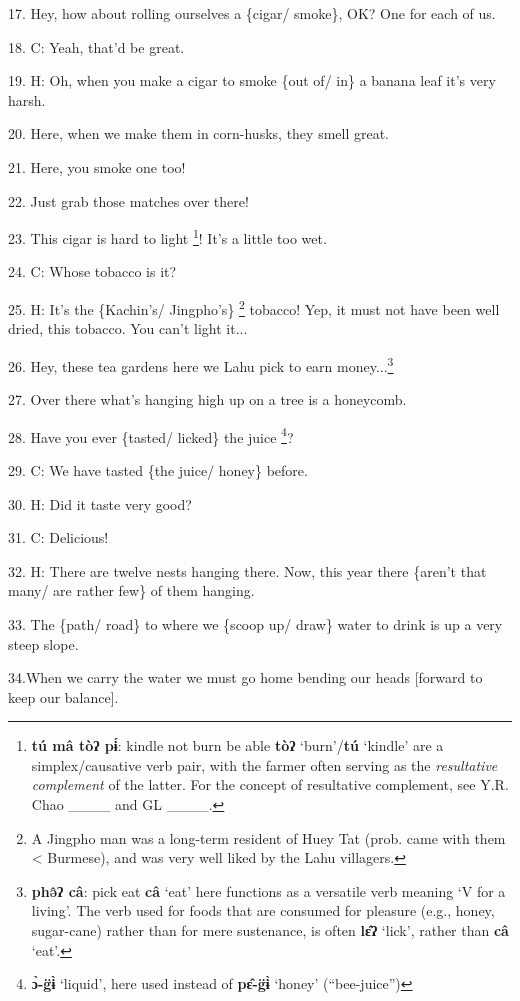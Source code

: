 17. Hey, how about rolling ourselves a \{cigar/ smoke\}, OK? One for each of us.

18. C: Yeah, that'd be great.

19. H: Oh, when you make a cigar to smoke \{out of/ in\} a banana leaf it's very
harsh.

20. Here, when we make them in corn-husks, they smell great.

21. Here, you smoke one too!

22. Just grab those matches over there!

23. This cigar is hard to light \footnote{\textbf{tú mâ tòʔ  pɨ́}:  kindle not burn be able  \textbf{tòʔ} `burn'/\textbf{tú} `kindle' are a simplex/causative verb pair, with the farmer often serving as the \textit{resultative complement }of the latter. For the concept of resultative complement, see Y.R. Chao \_\_\_\_ and GL \_\_\_\_.}! It's a little too wet.

24. C: Whose tobacco is it?

25. H: It's the \{Kachin's/ Jingpho's\} \footnote{A Jingpho man was a long-term resident of Huey Tat (prob. came with them < Burmese), and was very well liked by the Lahu villagers.} tobacco! Yep, it must not have been
well dried, this tobacco. You can't light it...

26. Hey, these tea gardens here we Lahu pick to earn money...\footnote{\textbf{phə̂ʔ câ}:  pick    eat  \textbf{câ }`eat' here functions as a versatile verb meaning `V for a living'. The verb used for foods that are consumed for pleasure (e.g., honey, sugar-cane) rather than for mere sustenance, is often \textbf{lɛ̂ʔ }`lick', rather than \textbf{câ }`eat'.}

27. Over there what's hanging high up on a tree is a honeycomb.

28. Have you ever \{tasted/ licked\} the juice \footnote{\textbf{ɔ̀-g̈ɨ̀} `liquid', here used instead of \textbf{pɛ̂-g̈ɨ̀ }`honey' (``bee-juice'')}?

29. C: We have tasted \{the juice/ honey\} before.

30. H: Did it taste very good?

31. C: Delicious!

32. H: There are twelve nests hanging there. Now, this year there \{aren't that
many/ are rather few\} of them hanging.

33. The \{path/ road\} to where we \{scoop up/ draw\} water to drink is up a very
steep slope.

34.When we carry the water we must go home bending our heads [forward to keep our
balance].

